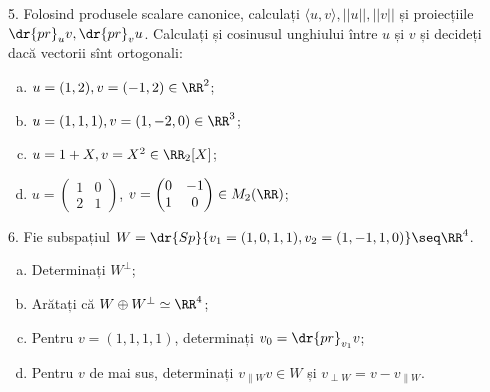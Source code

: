\vspace{0.5cm}

5. Folosind produsele scalare canonice, calculați $ \langle u, v \rangle, ||u||, ||v|| $
și proiecțiile $ \dr{pr}_u v, \dr{pr}_v u $. Calculați și cosinusul unghiului între
$ u $ și $ v $ și decideți dacă vectorii sînt ortogonali:
\begin{enumerate}[(a)]
\item $ u = (1, 2), v = (-1, 2) \in \RR^2 $;
\item $ u = (1, 1, 1), v = (1, -2, 0) \in \RR^3 $;
\item $ u = 1 + X, v = X^2 \in \RR_2[X] $;
\item $ u = \begin{pmatrix} 1 & 0 \\ 2 & 1 \end{pmatrix} $,
  $ v = \begin{pmatrix} 0 & -1 \\ 1 & 0 \end{pmatrix} \in M_2(\RR) $;
\end{enumerate}

\vspace{0.5cm}

6. Fie subspațiul $ W = \dr{Sp} \{ v_1 = (1, 0, 1, 1), v_2 = (1, -1, 1, 0) \} \seq \RR^4 $.
\begin{enumerate}[(a)]
\item Determinați $ W^\perp $;
\item Arătați că $ W \oplus W^\perp \simeq \RR^4 $;
\item Pentru $ v = (1, 1, 1, 1) $, determinați $ v_0 = \dr{pr}_{v_1} v $;
\item Pentru $ v $ de mai sus, determinați $ v_{\parallel W} v \in W $
  și $ v_{\perp W} = v - v_{\parallel W} $.
\end{enumerate}

\vspace{0.5cm}

